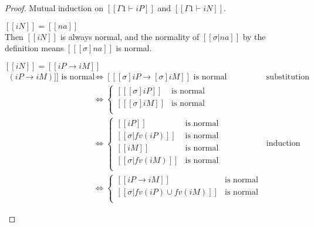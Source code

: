 \lemmaNormalAfterSubst*
\begin{proof}
  Mutual induction on $[[Γ1 ⊢ iP]]$ and $[[Γ1 ⊢ iN]]$.
  \begin{caseof}
  \item $[[iN]] = [[na]]$\\
    Then $[[iN]]$ is always normal, and
    the normality of $[[σ|{na}]]$ by the definition means $[[ [σ]na ]]$ is normal.

  \item $[[iN]] = [[iP → iM]]$ \label{case:normal-after-subst-arrow}
    \begin{align*}
      [[ [σ](iP → iM) ]] \text{ is normal} &\iff [[ [σ]iP → [σ]iM ]] \text{ is normal}
                                           && \text{substitution definition} \\
                                           &\iff
                                             \begin{cases}
                                             [[ [σ]iP ]] &\text{is normal} \\
                                             [[ [σ]iM ]] &\text{is normal} \\
                                             \end{cases}\\
                                           &\iff
                                             \begin{cases}
                                               [[ iP ]]       &\text{is normal} \\
                                               [[ σ|fv(iP) ]] &\text{is normal} \\
                                               [[ iM ]]       &\text{is normal} \\
                                               [[ σ|fv(iM) ]] &\text{is normal} \\
                                             \end{cases}
                                           && \text{induction hypothesis}\\
                                           &\iff
                                             \begin{cases}
                                               [[ iP → iM ]]  &\text{is normal} \\
                                               [[ σ|fv(iP) ∪ fv(iM)]] &\text{is normal} \\

\end{cases}
\end{align*}
\end{caseof}
\end{proof}
